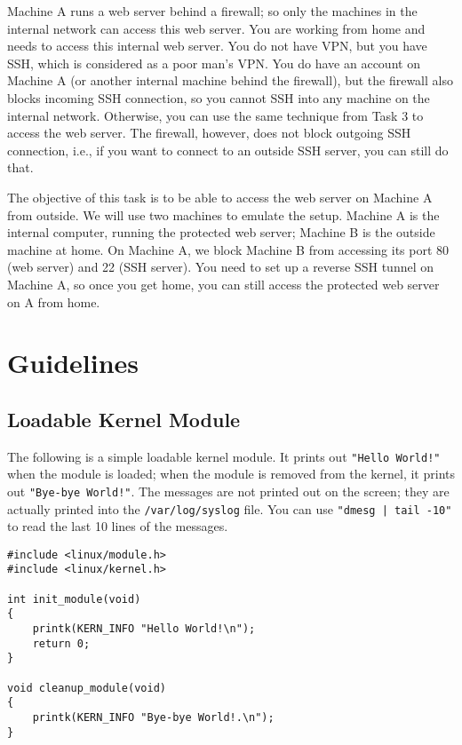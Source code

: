 Machine A runs a web server behind a firewall; so only the machines 
in the internal network can access this web server. 
You are working from home and needs to access this internal web server. 
You do not have VPN, but you have SSH, which is considered as 
a poor man's VPN. You do have an account on Machine A (or another internal machine behind the firewall), 
but the firewall also blocks incoming SSH connection, so you cannot SSH into any machine on the
internal network. Otherwise, you can use the same technique from Task 3 to access the web server. 
The firewall, however, does not block outgoing SSH connection, i.e., 
if you want to connect to an outside SSH server, you can still do that. 


The objective of this task is to be able to access the web server on Machine A from
outside.  We will use two machines to emulate the setup. Machine A is the internal computer,
running the protected web server; Machine B is the outside machine at home. 
On Machine A, we block Machine B from accessing its port 80 (web server) and 22 (SSH server).
You need to set up a reverse SSH tunnel on Machine A, so once you get home, you can 
still access the protected web server on A from home. 




\section{Guidelines}
\label{firewall:sec:guidelines}


\subsection{Loadable Kernel Module}

The following is a simple loadable kernel module. It prints out 
\texttt{"Hello World!"} when the module is loaded; when the module
is removed from the kernel, it prints out \texttt{"Bye-bye World!"}.
The messages are not printed out on the screen; they are 
actually printed into the \texttt{/var/log/syslog} file. You can
use \texttt{"dmesg | tail -10"} to read the last 10 lines of 
the messages. 


\begin{lstlisting}
#include <linux/module.h>
#include <linux/kernel.h>

int init_module(void)
{
    printk(KERN_INFO "Hello World!\n");
    return 0;
}

void cleanup_module(void)
{
    printk(KERN_INFO "Bye-bye World!.\n");
}
\end{lstlisting}

